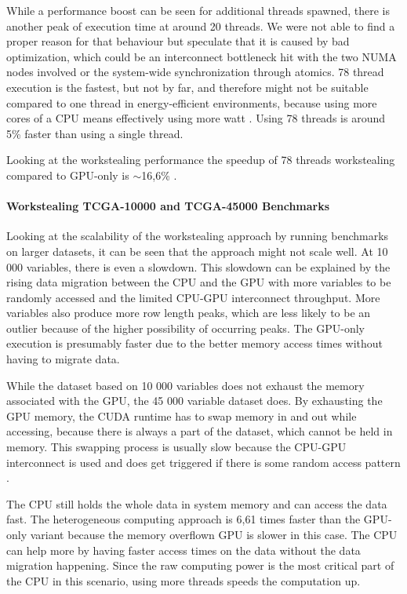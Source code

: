 While a performance boost can be seen for additional threads spawned, there is another peak of execution time at around 20 threads. We were not able to find a proper reason for that behaviour but speculate that it is caused by bad optimization, which could be an interconnect bottleneck hit with the two NUMA nodes involved or the system-wide synchronization through atomics. 78 thread execution is the fastest, but not by far, and therefore might not be suitable compared to one thread in energy-efficient environments, because using more cores of a CPU means effectively using more watt \cite{saravananStudyFactorsInfluencing2011}. Using 78 threads is around 5\% faster than using a single thread.

Looking at the workstealing performance the speedup of 78 threads workstealing compared to GPU-only is $\sim$16,6\% .

\paragraph{Workstealing TCGA-10000 and TCGA-45000 Benchmarks}


Looking at the scalability of the workstealing approach by running benchmarks on larger datasets, it can  be seen that the approach might not scale well. At 10 000 variables, there is even a slowdown. This slowdown can be explained by the rising data migration between the CPU and the GPU with more variables to be randomly accessed and the limited CPU-GPU interconnect throughput. More variables also produce more row length peaks, which are less likely to be an outlier because of the higher possibility of occurring peaks.
The GPU-only execution is presumably faster due to the better memory access times without having to migrate data.

While the dataset based on 10 000 variables does not exhaust the memory associated with the GPU, the 45 000 variable dataset does. By exhausting the GPU memory, the CUDA runtime has to swap memory in and out while accessing, because there is always a part of the dataset, which cannot be held in memory. This swapping process is usually slow because the CPU-GPU interconnect is used and does get triggered if there is some random access pattern \cite{gangulyAdaptivePageMigration2020, kimBatchAwareUnifiedMemory}.

The CPU still holds the whole data in system memory and can access the data fast. The heterogeneous computing approach is 6,61 times faster than the GPU-only variant because the memory overflown GPU is slower in this case. The CPU can help more by having faster access times on the data without the data migration happening.
Since the raw computing power is the most critical part of the CPU in this scenario, using more threads speeds the computation up.

